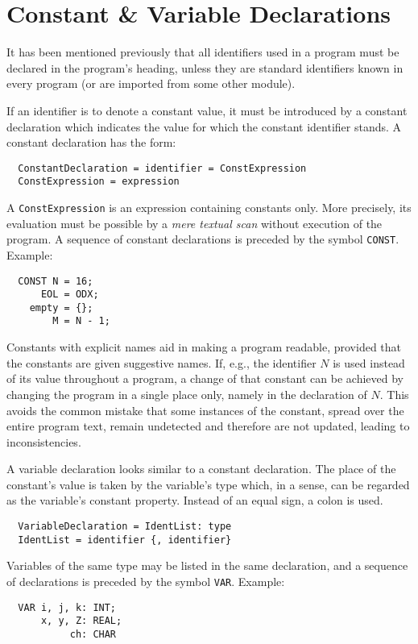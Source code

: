 \chapter{Constant \& Variable Declarations}
It has been mentioned previously that all identifiers used in a program must be declared
in the program's heading, unless they are standard identifiers known in every program (or
are imported from some other module).

If an identifier is to denote a constant value, it must be introduced by a constant
declaration which indicates the value for which the constant identifier stands. A
constant declaration has the form:
\begin{verbatim}
  ConstantDeclaration = identifier = ConstExpression
  ConstExpression = expression
\end{verbatim}
A \verb|ConstExpression| is an expression containing constants only. More precisely, its
evaluation must be possible by a \emph{mere textual scan} without execution of the program.
A sequence of constant declarations is preceded by the symbol \verb|CONST|. Example:
\begin{verbatim}
  CONST N = 16;
      EOL = ODX;
    empty = {};
        M = N - 1;
\end{verbatim}
Constants with explicit names aid in making a program readable, provided that the constants
are given suggestive names. If, e.g., the identifier $N$ is used instead of its value
throughout a program, a change of that constant can be achieved by changing the program
in a single place only, namely in the declaration of $N$. This avoids the common mistake
that some instances of the constant, spread over the entire program text, remain undetected
and therefore are not updated, leading to inconsistencies.

A variable declaration looks similar to a constant declaration. The place of the constant's
value is taken by the variable's type which, in a sense, can be regarded as the variable's
constant property.  Instead of an equal sign, a colon is used.
\begin{verbatim}
  VariableDeclaration = IdentList: type
  IdentList = identifier {, identifier}
\end{verbatim}
Variables of the same type may be listed in the same declaration, and a sequence of
declarations is preceded by the symbol \verb|VAR|. Example:
\begin{verbatim}
  VAR i, j, k: INT;
      x, y, Z: REAL;
           ch: CHAR
\end{verbatim}
